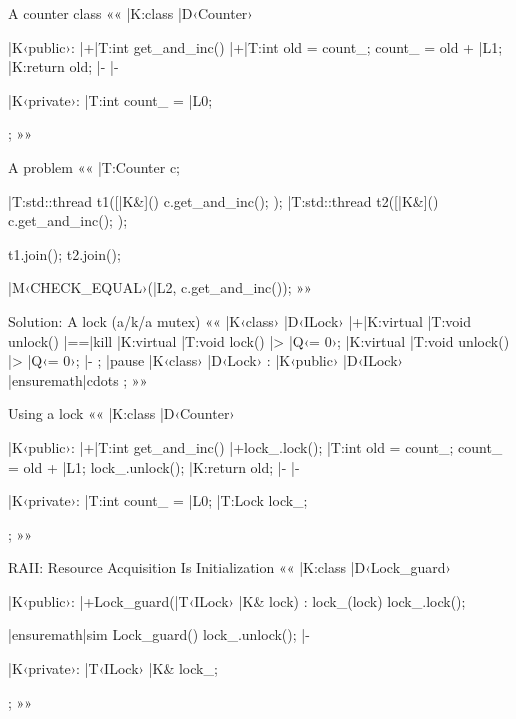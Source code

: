 \documentclass{beamer}
\begin{document}
\begin{frame}
\thispagestyle{empty}\centering
{}
\end{frame}

\begin{frame}[fragile]{A counter class}{}
  ««
  |K:class |D‹Counter›
  {
  |K‹public›:
  	|+|T:int get_and_inc()
    {
    	|+|T:int old = count_;
      count_ = old + |L1;
      |K:return old; |-
    } |-

  |K‹private›:
  	|T:int count_ = |L0;
  };
  »»
\end{frame}

\begin{frame}[fragile]{A problem}{}
««
|T:Counter c;

|T:std::thread t1([|K&]() { c.get_and_inc(); });
|T:std::thread t2([|K&]() { c.get_and_inc(); });

t1.join();
t2.join();

|M‹CHECK_EQUAL›(|L2, c.get_and_inc());
»»
\end{frame}

\begin{frame}[fragile]{Solution: A lock (a/k/a mutex)}{}
  ««
  |K‹class› |D‹ILock›
  {
  	|+|K:virtual |T:void unlock() |==|kill%
    |K:virtual |T:void lock() |> |Q‹= 0›;
    |K:virtual |T:void unlock() |> |Q‹= 0›; |-
  };
  |pause
  |K‹class› |D‹Lock› : |K‹public› |D‹ILock› { |ensuremath|cdots };
  »»
\end{frame}

\begin{frame}[fragile]{Using a lock}{}
  ««
  |K:class |D‹Counter›
  {
  |K‹public›:
  	|+|T:int get_and_inc()
    {
    	|+lock_.lock();
      |T:int old = count_;
      count_ = old + |L1;
      lock_.unlock();
      |K:return old; |-
    } |-

  |K‹private›:
  	|T:int count_ = |L0;
  	|T:Lock lock_;
  };
  »»
\end{frame}

\begin{frame}[fragile]{RAII: Resource Acquisition Is Initialization}{}
  ««
  |K:class |D‹Lock_guard›
  {
  |K‹public›:
  	|+Lock_guard(|T‹ILock› |K& lock) : lock_(lock)
    {
    	lock_.lock();
    }

    |ensuremath|sim Lock_guard()
    {
    	lock_.unlock();
    } |-

  |K‹private›:
  	|T‹ILock› |K& lock_;
  };
  »»
\end{frame}
\end{document}
